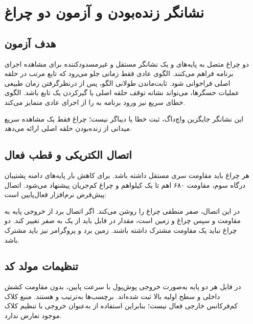\chapter{نشانگر زنده‌بودن و آزمون دو چراغ}

\section{هدف آزمون}
دو چراغ متصل به پایه‌های
و
یک نشانگر مستقل و غیرمسدودکننده برای مشاهده اجرای برنامه فراهم می‌کنند. الگوی عادی فقط زمانی جلو می‌رود که تابع
مرتب در حلقه اصلی فراخوانی شود. ثابت‌ماندن طولانی الگو، پس از درنظرگرفتن زمان طبیعی عملیات حسگرها، می‌تواند نشانه توقف حلقه اصلی یا گیرکردن یک تابع باشد. الگوی خطای سریع نیز ورود برنامه به
را از اجرای عادی متمایز می‌کند.

این نشانگر جایگزین واچ‌داگ، ثبت خطا یا دیباگر نیست؛ چراغ فقط یک مشاهده سریع میدانی از زنده‌بودن حلقه اصلی ارائه می‌دهد.

\section{اتصال الکتریکی و قطب فعال}
هر چراغ باید مقاومت سری مستقل داشته باشد. برای کاهش بار پایه‌های دامنه پشتیبان درگاه سوم، مقاومت ۶۸۰ اهم تا یک کیلواهم و چراغ کم‌جریان پیشنهاد می‌شود. اتصال پیش‌فرض نرم‌افزار فعال‌پایین است:

\begin{center}
\end{center}

در این اتصال، صفر منطقی چراغ را روشن می‌کند. اگر اتصال برد از خروجی پایه به مقاومت و سپس چراغ و زمین است، مقدار
در فایل
باید از یک به صفر تغییر کند. دو چراغ نباید یک مقاومت مشترک داشته باشند. زمین برد و پروگرامر نیز باید مشترک باشد.

\section{تنظیمات مولد کد}
در فایل
هر دو پایه به‌صورت خروجی پوش‌پول با سرعت پایین، بدون مقاومت کشش داخلی و سطح اولیه بالا ثبت شده‌اند. برچسب‌ها به‌ترتیب
و
هستند. منبع کلاک کم‌فرکانس خارجی فعال نیست؛ بنابراین استفاده از
به‌عنوان خروجی با تنظیم کلاک موجود تعارض ندارد.

